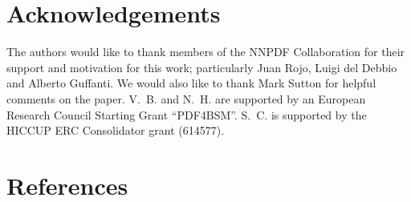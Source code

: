 \documentclass[preprint,12pt]{elsarticle}
\begin{document}
\section*{Acknowledgements}

The authors would like to thank members of the NNPDF Collaboration for their support and
motivation for this work; particularly Juan Rojo, Luigi del Debbio and Alberto Guffanti. We would also like
to thank Mark Sutton for helpful comments on the paper. V.~B. and N.~H. are
supported by an European Research Council Starting Grant ``PDF4BSM''.
S.~C. is supported by the HICCUP ERC Consolidator grant (614577).





\section*{References}








\end{document}
